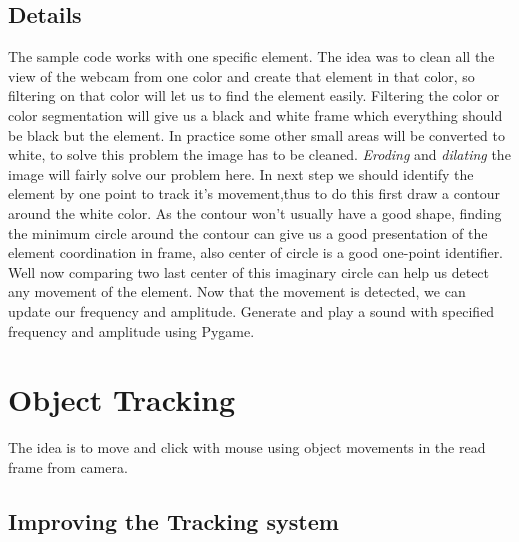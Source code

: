 \documentclass{report}
\begin{document}
\subsection{Details}
The sample code works with one specific element. The idea was to clean all the view of the webcam from one color and create that element in that color, so filtering on that color will let us to find the element easily. Filtering the color or color segmentation will give us a black and white frame which everything should be black but the element. In practice some other small areas will be converted to white, to solve this problem the image has to be cleaned. \textit{Eroding} and \textit{dilating} the image will fairly solve our problem here. In next step we should identify the element by one point to track it's movement,thus to do this first draw a contour around the white color. As the contour won't usually have a good shape, finding the minimum circle around the contour can give us a good presentation of the element coordination in frame, also center of circle is a good one-point identifier. \newline
Well now comparing two last center of this imaginary circle can help us detect any movement of the element. Now that the movement is detected, we can update our frequency and amplitude. Generate and play a sound with specified frequency and amplitude using Pygame. 

\section{Object Tracking}
The idea is to move and click with mouse using object movements in the read frame from camera. 
\subsection{Improving the Tracking system}
\end{document}
